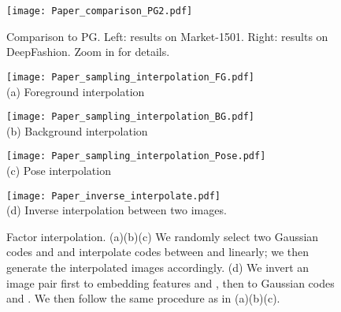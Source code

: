\documentclass[10pt,twocolumn,letterpaper]{article}
\begin{document}
\begin{figure*} [htbp]
\scriptsize
\centering
  \centering
  \texttt{[image: Paper\_comparison\_PG2.pdf]}\\
\caption{Comparison to PG. Left: results on Market-1501. Right: results on DeepFashion. Zoom in for details.}
\label{fig:Paper_comparison_PG2}
\end{figure*}

\begin{figure*} [htp]
\scriptsize
\centering
\begin{minipage}{0.32\textwidth}
\hspace{-0.2cm}
  \centering
  \texttt{[image: Paper\_sampling\_interpolation\_FG.pdf]}\\
(a) Foreground interpolation
\end{minipage}
\hfill
\begin{minipage}{0.32\textwidth}
  \centering
  \texttt{[image: Paper\_sampling\_interpolation\_BG.pdf]}\\
(b) Background interpolation
\end{minipage}
\hfill
\begin{minipage}{0.32\textwidth}
  \centering
  \texttt{[image: Paper\_sampling\_interpolation\_Pose.pdf]}\\
(c) Pose interpolation
\end{minipage}
\hfill
\begin{minipage}{0.99\textwidth}
  \centering
  \texttt{[image: Paper\_inverse\_interpolate.pdf]}\\
(d) Inverse interpolation between two images.
\end{minipage}
  \caption{Factor interpolation. (a)(b)(c) We randomly select two Gaussian codes  and  and interpolate codes between  and  linearly; we then generate the interpolated images accordingly. (d) We invert an image pair first to embedding features  and , then to Gaussian codes  and . We then follow the same procedure as in (a)(b)(c).}
\label{fig:Paper_interpolate}
\end{figure*}
\end{document}
